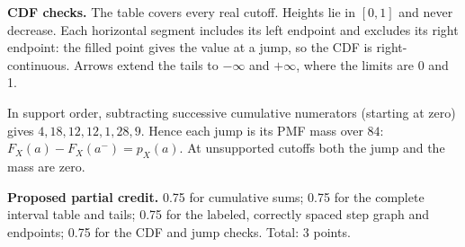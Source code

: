 \begin{center}\end{center}

\textbf{CDF checks.} The table covers every real cutoff. Heights lie in $[0,1]$ and never decrease. Each horizontal segment includes its left endpoint and excludes its right endpoint: the filled point gives the value at a jump, so the CDF is right-continuous. Arrows extend the tails to $-\infty$ and $+\infty$, where the limits are 0 and 1.

In support order, subtracting successive cumulative numerators (starting at zero) gives $4,18,12,12,1,28,9$. Hence each jump is its PMF mass over $84$: $F_X(a)-F_X(a^-)=p_X(a)$. At unsupported cutoffs both the jump and the mass are zero.

\textbf{Proposed partial credit.} 0.75 for cumulative sums; 0.75 for the complete interval table and tails; 0.75 for the labeled, correctly spaced step graph and endpoints; 0.75 for the CDF and jump checks. Total: 3 points.

